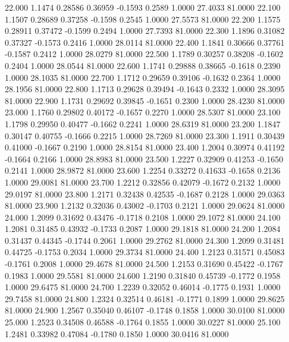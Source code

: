   22.000   1.1474   0.28586   0.36959  -0.1593   0.2589   1.0000  27.4033  81.0000
  22.100   1.1507   0.28689   0.37258  -0.1598   0.2545   1.0000  27.5573  81.0000
  22.200   1.1575   0.28911   0.37472  -0.1599   0.2494   1.0000  27.7393  81.0000
  22.300   1.1896   0.31082   0.37327  -0.1573   0.2416   1.0000  28.0114  81.0000
  22.400   1.1841   0.30666   0.37761  -0.1587   0.2412   1.0000  28.0279  81.0000
  22.500   1.1789   0.30257   0.38208  -0.1602   0.2404   1.0000  28.0544  81.0000
  22.600   1.1741   0.29888   0.38665  -0.1618   0.2390   1.0000  28.1035  81.0000
  22.700   1.1712   0.29659   0.39106  -0.1632   0.2364   1.0000  28.1956  81.0000
  22.800   1.1713   0.29628   0.39494  -0.1643   0.2332   1.0000  28.3095  81.0000
  22.900   1.1731   0.29692   0.39845  -0.1651   0.2300   1.0000  28.4230  81.0000
  23.000   1.1760   0.29802   0.40172  -0.1657   0.2270   1.0000  28.5307  81.0000
  23.100   1.1798   0.29950   0.40477  -0.1662   0.2241   1.0000  28.6319  81.0000
  23.200   1.1847   0.30147   0.40755  -0.1666   0.2215   1.0000  28.7269  81.0000
  23.300   1.1911   0.30439   0.41000  -0.1667   0.2190   1.0000  28.8154  81.0000
  23.400   1.2004   0.30974   0.41192  -0.1664   0.2166   1.0000  28.8983  81.0000
  23.500   1.2227   0.32909   0.41253  -0.1650   0.2141   1.0000  28.9872  81.0000
  23.600   1.2254   0.33272   0.41633  -0.1658   0.2136   1.0000  29.0081  81.0000
  23.700   1.2212   0.32856   0.42079  -0.1672   0.2132   1.0000  29.0197  81.0000
  23.800   1.2171   0.32438   0.42535  -0.1687   0.2128   1.0000  29.0363  81.0000
  23.900   1.2132   0.32036   0.43002  -0.1703   0.2121   1.0000  29.0624  81.0000
  24.000   1.2099   0.31692   0.43476  -0.1718   0.2108   1.0000  29.1072  81.0000
  24.100   1.2081   0.31485   0.43932  -0.1733   0.2087   1.0000  29.1818  81.0000
  24.200   1.2084   0.31437   0.44345  -0.1744   0.2061   1.0000  29.2762  81.0000
  24.300   1.2099   0.31481   0.44725  -0.1753   0.2034   1.0000  29.3734  81.0000
  24.400   1.2123   0.31571   0.45083  -0.1761   0.2008   1.0000  29.4678  81.0000
  24.500   1.2153   0.31690   0.45422  -0.1767   0.1983   1.0000  29.5581  81.0000
  24.600   1.2190   0.31840   0.45739  -0.1772   0.1958   1.0000  29.6475  81.0000
  24.700   1.2239   0.32052   0.46014  -0.1775   0.1931   1.0000  29.7458  81.0000
  24.800   1.2324   0.32514   0.46181  -0.1771   0.1899   1.0000  29.8625  81.0000
  24.900   1.2567   0.35040   0.46107  -0.1748   0.1858   1.0000  30.0100  81.0000
  25.000   1.2523   0.34508   0.46588  -0.1764   0.1855   1.0000  30.0227  81.0000
  25.100   1.2481   0.33982   0.47084  -0.1780   0.1850   1.0000  30.0416  81.0000
